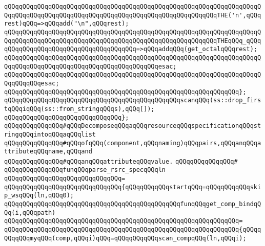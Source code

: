 \newline
\newline
\verb|qQQqqQQqqQQqqQQqqQQqqQQqqQQqqQQqqQQqqQQqqQQqqQQqqQQqqQQqqQQqqQQqqQQqqQQqqQQqqQQqqQQqqQQqqQQqqQQqqQQqqQQqqQQqqQQqqQQqqQQqqQQqqQQqTHE('n',qQQqrest)qQQq=>qQQqadd("\n",qQQqrest);|\newline
\verb|qQQqqQQqqQQqqQQqqQQqqQQqqQQqqQQqqQQqqQQqqQQqqQQqqQQqqQQqqQQqqQQqqQQqqQQqqQQqqQQqqQQqqQQqqQQqqQQqqQQqqQQqqQQqqQQqqQQqqQQqqQQqqQQqTHEqQQq_qQQqqQQqqQQqqQQqqQQqqQQqqQQqqQQqqQQqqQQq=>qQQqaddqQQq(get_octalqQQqrest);|\newline
\verb|qQQqqQQqqQQqqQQqqQQqqQQqqQQqqQQqqQQqqQQqqQQqqQQqqQQqqQQqqQQqqQQqqQQqqQQqqQQqqQQqqQQqqQQqqQQqqQQqqQQqqQQqqQQqqQQqesac;|\newline
\verb|qQQqqQQqqQQqqQQqqQQqqQQqqQQqqQQqqQQqqQQqqQQqqQQqqQQqqQQqqQQqqQQqqQQqqQQqqQQqqQQqesac;|\newline
\verb|qQQqqQQqqQQqqQQqqQQqqQQqqQQqqQQqqQQqqQQqqQQqqQQqqQQqqQQqqQQqqQQq};|\newline
\newline
\verb|qQQqqQQqqQQqqQQqqQQqqQQqqQQqqQQqqQQqqQQqqQQqqQQqscanqQQq(ss::drop_firstqQQqiqQQq(ss::from_stringqQQqs),qQQq[]);|\newline
\verb|qQQqqQQqqQQqqQQqqQQqqQQqqQQqqQQq};|\newline
\newline
\verb|qQQqqQQqqQQqqQQq#qQQqDecomposeqQQqaqQQqresourceqQQqspecificationqQQqstringqQQqintoqQQqaqQQqlist|\newline
\verb|qQQqqQQqqQQqqQQq#qQQqofqQQq(component,qQQqnaming)qQQqpairs,qQQqanqQQqattributeqQQqname,qQQqand|\newline
\verb|qQQqqQQqqQQqqQQq#qQQqanqQQqattributeqQQqvalue.|\newline
\verb|qQQqqQQqqQQqqQQq#|\newline
\verb|qQQqqQQqqQQqqQQqfunqQQqparse_rsrc_specqQQqln|\newline
\verb|qQQqqQQqqQQqqQQqqQQqqQQqqQQqqQQq=|\newline
\verb|qQQqqQQqqQQqqQQqqQQqqQQqqQQqqQQq{qQQqqQQqqQQqstartqQQq=qQQqqQQqqQQqskip_wsqQQq(ln,qQQq0);|\newline
\newline
\verb|qQQqqQQqqQQqqQQqqQQqqQQqqQQqqQQqqQQqqQQqqQQqqQQqfunqQQqget_comp_bindqQQq(i,qQQqpath)|\newline
\verb|qQQqqQQqqQQqqQQqqQQqqQQqqQQqqQQqqQQqqQQqqQQqqQQqqQQqqQQqqQQqqQQq=|\newline
\verb|qQQqqQQqqQQqqQQqqQQqqQQqqQQqqQQqqQQqqQQqqQQqqQQqqQQqqQQqqQQqqQQq{qQQqqQQqqQQqmyqQQq(comp,qQQqi)qQQq=qQQqqQQqqQQqscan_compqQQq(ln,qQQqi);|\newline
